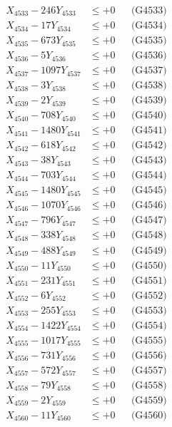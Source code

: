 \documentclass[a4paper,10pt]{article}
\begin{document}
{\begin{align}
X_{4533} - 246Y_{4533} &\leq +0 && \text{(G4533)} \\
X_{4534} - 17Y_{4534} &\leq +0 && \text{(G4534)} \\
X_{4535} - 673Y_{4535} &\leq +0 && \text{(G4535)} \\
X_{4536} - 5Y_{4536} &\leq +0 && \text{(G4536)} \\
X_{4537} - 1097Y_{4537} &\leq +0 && \text{(G4537)} \\
X_{4538} - 3Y_{4538} &\leq +0 && \text{(G4538)} \\
X_{4539} - 2Y_{4539} &\leq +0 && \text{(G4539)} \\
X_{4540} - 708Y_{4540} &\leq +0 && \text{(G4540)} \\
\allowbreak
X_{4541} - 1480Y_{4541} &\leq +0 && \text{(G4541)} \\
X_{4542} - 618Y_{4542} &\leq +0 && \text{(G4542)} \\
X_{4543} - 38Y_{4543} &\leq +0 && \text{(G4543)} \\
X_{4544} - 703Y_{4544} &\leq +0 && \text{(G4544)} \\
X_{4545} - 1480Y_{4545} &\leq +0 && \text{(G4545)} \\
X_{4546} - 1070Y_{4546} &\leq +0 && \text{(G4546)} \\
X_{4547} - 796Y_{4547} &\leq +0 && \text{(G4547)} \\
X_{4548} - 338Y_{4548} &\leq +0 && \text{(G4548)} \\
X_{4549} - 488Y_{4549} &\leq +0 && \text{(G4549)} \\
X_{4550} - 11Y_{4550} &\leq +0 && \text{(G4550)} \\
\allowbreak
X_{4551} - 231Y_{4551} &\leq +0 && \text{(G4551)} \\
X_{4552} - 6Y_{4552} &\leq +0 && \text{(G4552)} \\
X_{4553} - 255Y_{4553} &\leq +0 && \text{(G4553)} \\
X_{4554} - 1422Y_{4554} &\leq +0 && \text{(G4554)} \\
X_{4555} - 1017Y_{4555} &\leq +0 && \text{(G4555)} \\
X_{4556} - 731Y_{4556} &\leq +0 && \text{(G4556)} \\
X_{4557} - 572Y_{4557} &\leq +0 && \text{(G4557)} \\
X_{4558} - 79Y_{4558} &\leq +0 && \text{(G4558)} \\
X_{4559} - 2Y_{4559} &\leq +0 && \text{(G4559)} \\
X_{4560} - 11Y_{4560} &\leq +0 && \text{(G4560)} \\

\end{align}}
\end{document}
